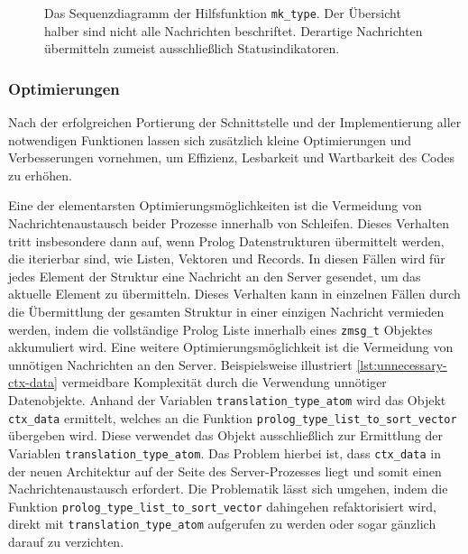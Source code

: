 \begin{figure}[!htp]
  \caption{Das Sequenzdiagramm der Hilfsfunktion \texttt{mk\_type}. Der Übersicht halber sind nicht alle Nachrichten beschriftet. Derartige Nachrichten übermitteln zumeist ausschließlich Statusindikatoren.}
  \label{fig:mk-type-sequence}
\end{figure}

\subsubsection{Optimierungen}
\label{subsec:optimizations}

Nach der erfolgreichen Portierung der Schnittstelle und der Implementierung aller notwendigen Funktionen
lassen sich zusätzlich kleine Optimierungen und Verbesserungen vornehmen, um Effizienz, Lesbarkeit und Wartbarkeit des Codes zu erhöhen.

Eine der elementarsten Optimierungsmöglichkeiten ist die Vermeidung von Nachrichtenaustausch beider Prozesse
innerhalb von Schleifen. Dieses Verhalten tritt insbesondere dann auf, wenn Prolog Datenstrukturen übermittelt werden,
die iterierbar sind, wie Listen, Vektoren und Records.
In diesen Fällen wird für jedes Element der Struktur eine Nachricht an den Server gesendet,
um das aktuelle Element zu übermitteln.
Dieses Verhalten kann in einzelnen Fällen durch die Übermittlung der gesamten Struktur in einer einzigen Nachricht vermieden werden,
indem die vollständige Prolog Liste innerhalb eines \texttt{zmsg\_t} Objektes akkumuliert wird.
Eine weitere Optimierungsmöglichkeit ist die Vermeidung von unnötigen Nachrichten an den Server.
Beispielsweise illustriert \cref{lst:unnecessary-ctx-data} vermeidbare Komplexität durch die Verwendung unnötiger Datenobjekte.
Anhand der Variablen \texttt{translation\_type\_atom} wird das Objekt \texttt{ctx\_data} ermittelt, welches an die Funktion \texttt{prolog\_type\_list\_to\_sort\_vector} übergeben wird.
Diese verwendet das Objekt ausschließlich zur Ermittlung der Variablen \texttt{translation\_type\_atom}. Das Problem hierbei ist,
dass \texttt{ctx\_data} in der neuen Architektur auf der Seite des Server-Prozesses liegt und somit einen Nachrichtenaustausch erfordert.
Die Problematik lässt sich umgehen, indem die Funktion \texttt{prolog\_type\_list\_to\_sort\_vector} dahingehen refaktorisiert wird,
direkt mit \texttt{translation\_type\_atom} aufgerufen zu werden oder sogar gänzlich darauf zu verzichten.

